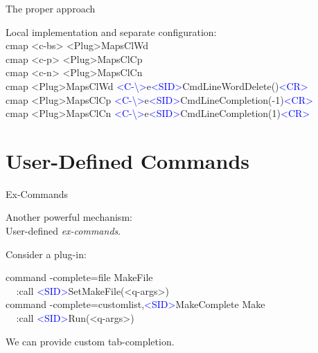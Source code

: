 \documentclass{beamer}
\newenvironment{mycode}[0]
{\ttfamily}
{}
\newcommand{\myind}[1]{\textcolor{white}{#1}}
\newcommand{\myctrlkey}[1]{\textcolor{blue}{#1}}
\begin{document}
\begin{frame}{The proper approach}{}
\begin{overprint}

		Local implementation and separate configuration: \\

		\begin{mycode}
			cmap  <c-bs>   <Plug>MapsClWd \\
			cmap  <c-p> {} <Plug>MapsClCp \\
			cmap  <c-n> {} <Plug>MapsClCn \\[2mm]
%
			cmap  <Plug>MapsClWd   \myctrlkey{<C-\textbackslash>}e\myctrlkey{<SID>}CmdLineWordDelete()\myctrlkey{<CR>} \\
			cmap  <Plug>MapsClCp   \myctrlkey{<C-\textbackslash>}e\myctrlkey{<SID>}CmdLineCompletion(-1)\myctrlkey{<CR>} \\
			cmap  <Plug>MapsClCn   \myctrlkey{<C-\textbackslash>}e\myctrlkey{<SID>}CmdLineCompletion(1)\myctrlkey{<CR>}
%
		\end{mycode}
	\end{overprint}

\end{frame}


\section{User-Defined Commands}

\begin{frame}{Ex-Commands}{}

	Another powerful mechanism: \\
	User-defined \textit{ex-commands}. \\

	\vspace{5mm}
	\pause

	Consider a  plug-in: \\
	\vspace{2mm}

	\begin{mycode}
		command -complete=file MakeFile \\
		\myind{....}:call \myctrlkey{<SID>}SetMakeFile(<q-args>) \\
		command -complete=customlist,\myctrlkey{<SID>}MakeComplete Make \\
		\myind{....}:call \myctrlkey{<SID>}Run(<q-args>) \\
	\end{mycode}

	\vspace{5mm}
	\pause

	We can provide custom tab-completion.

\end{frame}
\end{document}
